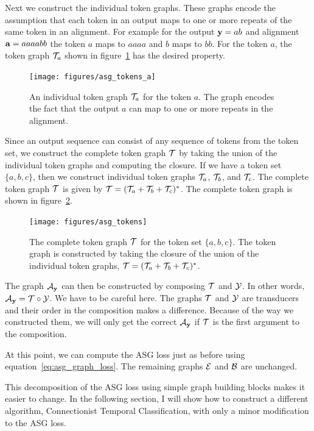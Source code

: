 Next we construct the individual token graphs. These graphs encode the
assumption that each token in an output maps to one or more repeats of the same
token in an alignment. For example for the output ${\bf y} = ab$ and alignment ${\bf a}
= aaaabb$ the token $a$ maps to $aaaa$ and $b$ maps to  $bb$. For the token
$a$, the token graph $\mathcal{T}_a$ shown in figure~\ref{fig:asg_tokens_a} has the
desired property.

\begin{figure}
    \centering
    \texttt{[image: figures/asg\_tokens\_a]}
    \caption{An individual token graph $\mathcal{T}_a$ for the token $a$. The graph
    encodes the fact that the output $a$ can map to one or more repeats in the
    alignment.}
    \label{fig:asg_tokens_a}
\end{figure}

Since an output sequence can consist of any sequence of tokens from the token
set, we construct the complete token graph $\mathcal{T}$ by taking the union of the
individual token graphs and computing the closure. If we have a token set $\{a,
b, c\}$, then we construct individual token graphs $\mathcal{T}_a$, $\mathcal{T}_b$, and
$\mathcal{T}_c$. The complete token graph $\mathcal{T}$ is given by $\mathcal{T} = (\mathcal{T}_a + \mathcal{T}_b +
\mathcal{T}_c)^*$. The complete token graph is shown in figure~\ref{fig:asg_tokens}.

\begin{figure}
    \centering
    \texttt{[image: figures/asg\_tokens]}
    \caption{The complete token graph $\mathcal{T}$ for the token set $\{a, b, c\}$.
    The token graph is constructed by taking the closure of the union of the
    individual token graphs, $\mathcal{T} = (\mathcal{T}_a + \mathcal{T}_b + \mathcal{T}_c)^*$.}
    \label{fig:asg_tokens}
\end{figure}

The graph $\mathcal{A}_{\bf y}$ can then be constructed by composing $\mathcal{T}$ and $\mathcal{Y}$. In
other words, $\mathcal{A}_{\bf y} = \mathcal{T} \circ \mathcal{Y}$. We have to be careful here. The graphs
$\mathcal{T}$ and $\mathcal{Y}$ are transducers and their order in the composition makes a
difference. Because of the way we constructed them, we will only get the
correct $\mathcal{A}_{\bf y}$ if $\mathcal{T}$ is the first argument to the composition.

At this point, we can compute the ASG loss just as before using
equation~\ref{eq:asg_graph_loss}. The remaining graphs $\mathcal{E}$ and $\mathcal{B}$ are
unchanged.

This decomposition of the ASG loss using simple graph building blocks makes it
easier to change. In the following section, I will show how to construct a
different algorithm, Connectionist Temporal Classification, with only a minor
modification to the ASG loss.

